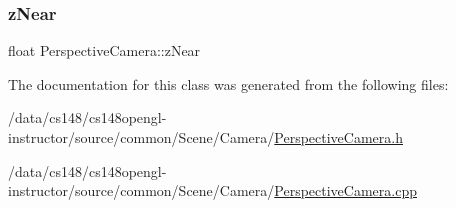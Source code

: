 \subsubsection{\texorpdfstring{z\+Near}{zNear}}
{\footnotesize\ttfamily float Perspective\+Camera\+::z\+Near\hspace{0.3cm}{\ttfamily [private]}}



The documentation for this class was generated from the following files\+:\begin{DoxyCompactItemize}
\item 
/data/cs148/cs148opengl-\/instructor/source/common/\+Scene/\+Camera/\hyperlink{_perspective_camera_8h}{Perspective\+Camera.\+h}\item 
/data/cs148/cs148opengl-\/instructor/source/common/\+Scene/\+Camera/\hyperlink{_perspective_camera_8cpp}{Perspective\+Camera.\+cpp}\end{DoxyCompactItemize}
